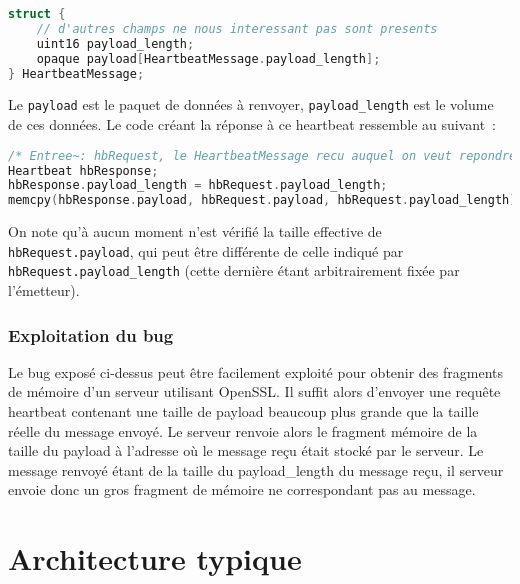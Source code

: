 \documentclass[a4paper,oneside,1pt]{article}
\begin{document}

\begin{lstlisting}[language=C]
struct {
	// d'autres champs ne nous interessant pas sont presents
	uint16 payload_length;
	opaque payload[HeartbeatMessage.payload_length];
} HeartbeatMessage;
\end{lstlisting}

Le \texttt{payload} est le paquet de données à renvoyer, \texttt{payload\_length} est le volume de ces données. Le code créant la réponse à ce heartbeat ressemble au suivant~:

\begin{lstlisting}[language=C]
/* Entree~: hbRequest, le HeartbeatMessage recu auquel on veut repondre */
Heartbeat hbResponse;
hbResponse.payload_length = hbRequest.payload_length;
memcpy(hbResponse.payload, hbRequest.payload, hbRequest.payload_length);
\end{lstlisting}

On note qu'à aucun moment n'est vérifié la taille effective de \texttt{hbRequest.payload}, qui peut être différente de celle indiqué par \texttt{hbRequest.payload\_length} (cette dernière étant arbitrairement fixée par l'émetteur).

\subsubsection{Exploitation du bug}
Le bug exposé ci-dessus peut être facilement exploité pour obtenir des fragments de mémoire d'un serveur utilisant OpenSSL. Il suffit alors d'envoyer une requête heartbeat contenant une taille de payload beaucoup plus grande que la taille réelle du message envoyé. Le serveur renvoie alors le fragment mémoire de la taille du payload à l'adresse où le message reçu était stocké par le serveur. Le message renvoyé étant de la taille du payload_length du message reçu, il serveur envoie donc un gros fragment de mémoire ne correspondant pas au message.


\section{Architecture typique}
\end{document}
